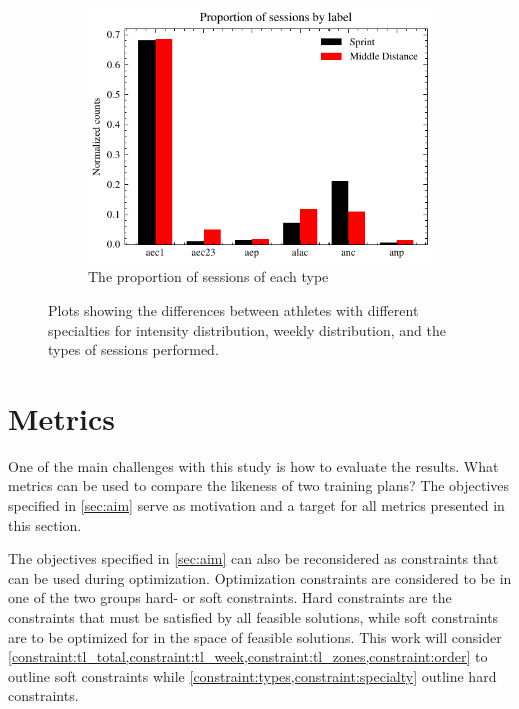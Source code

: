 \begin{figure}[ht]
    \begin{subfigure}[t]{0.48\textwidth}
        \centering
        \includegraphics[width=\textwidth]{chapters/figures/data_exploration/labels_by_spec.pdf}
        \captionsetup{width=.9\linewidth}
        \caption{The proportion of sessions of each type}
    \end{subfigure}
    \caption{Plots showing the differences between athletes with different specialties for intensity distribution, weekly distribution, and the types of sessions performed.}
    \label{fig:data_exploration_spec}
\end{figure}


\section{Metrics}
One of the main challenges with this study is how to evaluate the results.
What metrics can be used to compare the likeness of two training plans?
The objectives specified in \cref{sec:aim} serve as motivation and a target for all metrics presented in this section.

The objectives specified in \cref{sec:aim} can also be reconsidered as constraints that can be used during optimization.
Optimization constraints are considered to be in one of the two groups hard- or soft constraints.
Hard constraints are the constraints that must be satisfied by all feasible solutions, while soft constraints are to be optimized for in the space of feasible solutions.
This work will consider \cref{constraint:tl_total,constraint:tl_week,constraint:tl_zones,constraint:order} to outline soft constraints while \cref{constraint:types,constraint:specialty} outline hard constraints. 
 
